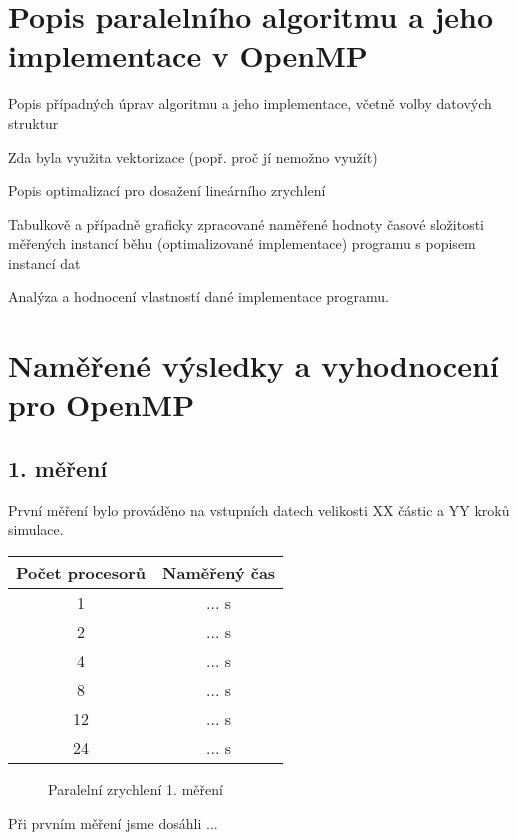 \documentclass[12pt]{article}
\begin{document}
\section{Popis paralelního algoritmu a jeho implementace v OpenMP}

    Popis případných úprav algoritmu a jeho implementace, včetně volby datových struktur

    Zda byla využita vektorizace (popř. proč jí nemožno využít)

    Popis optimalizací pro dosažení lineárního zrychlení

    Tabulkově a případně graficky zpracované naměřené hodnoty časové složitosti měřených instancí běhu (optimalizované implementace) programu s popisem instancí dat

    Analýza a hodnocení vlastností dané implementace programu.

\section{Naměřené výsledky a vyhodnocení pro OpenMP}

\subsection{1. měření}
První měření bylo prováděno na vstupních datech velikosti XX částic a YY kroků simulace.

\begin{center}
\begin{tabular}{ c | c }
\textbf{Počet procesorů} & \textbf{Naměřený čas} \\ \hline \hline 
1 & ... s \\ \hline
2 & ... s \\ \hline
4 & ... s \\ \hline
8 & ... s \\ \hline
12 & ... s \\ \hline
24 & ... s \\ \hline
\end{tabular}
\end{center}

\begin{figure}[h]
  \begin{center}
    \caption{Paralelní zrychlení 1. měření} 
  \end{center}
\end{figure}

Při prvním měření jsme dosáhli ...
\end{document}
